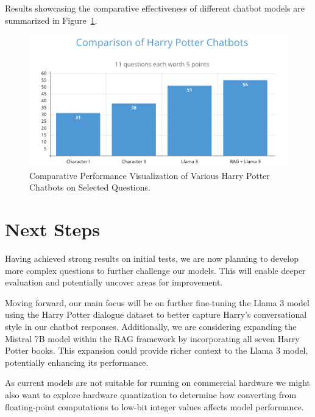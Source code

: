 \documentclass[fleqn,moreauthors,10pt]{ds_report}
\begin{document}
    Results showcasing the comparative effectiveness of different chatbot models are summarized in Figure~\ref{fig:results}.
    \begin{figure}[!htb]
            \centering 
    	\includegraphics[width=\linewidth]{fig/results.png}
    	\caption{Comparative Performance Visualization of Various Harry Potter Chatbots on Selected Questions.}
    	\label{fig:results}
    \end{figure}

\section*{Next Steps}

Having achieved strong results on initial tests, we are now planning to develop more complex questions to further challenge our models. This will enable deeper evaluation and potentially uncover areas for improvement.

Moving forward, our main focus will be on further fine-tuning the Llama 3 model using the Harry Potter dialogue dataset to better capture Harry's conversational style in our chatbot responses. Additionally, we are considering expanding the Mistral 7B model within the RAG framework by incorporating all seven Harry Potter books. This expansion could provide richer context to the Llama 3 model, potentially enhancing its performance. 

As current models are not suitable for running on commercial hardware we might also want to explore hardware quantization to determine how converting from floating-point computations to low-bit integer values affects model performance.

\clearpage
\end{document}
